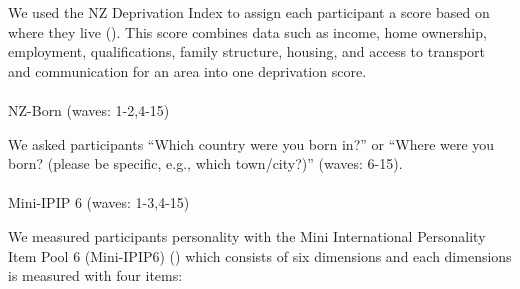 \documentclass[
  singlecolumn,
  9pt]{article}
\makeatletter
\let\oldparagraph\paragraph
\renewcommand{\paragraph}{
    \@ifstar
      \xxxParagraphStar
      \xxxParagraphNoStar
  }
\newcommand{\xxxParagraphStar}[1]{\oldparagraph*{#1}\mbox{}}
\newcommand{\xxxParagraphNoStar}[1]{\oldparagraph{#1}\mbox{}}
\makeatother
\begin{document}
We used the NZ Deprivation Index to assign each participant a score
based on where they live (). This score combines data such as income, home ownership,
employment, qualifications, family structure, housing, and access to
transport and communication for an area into one deprivation score.

\paragraph{NZ-Born (waves: 1-2,4-15)}\label{nz-born-waves-1-24-15}

We asked participants ``Which country were you born in?'' or ``Where
were you born? (please be specific, e.g., which town/city?)'' (waves:
6-15).

\paragraph{Mini-IPIP 6 (waves:
1-3,4-15)}\label{mini-ipip-6-waves-1-34-15}

We measured participants personality with the Mini International
Personality Item Pool 6 (Mini-IPIP6) () which consists of six dimensions and each
dimensions is measured with four items:
\end{document}
